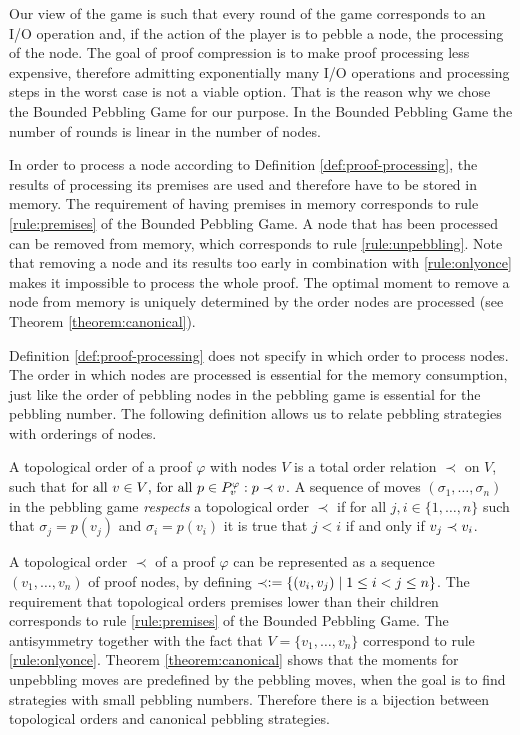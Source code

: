 Our view of the game is such that every round of the game corresponds to an I/O operation and, if the action of the player is to pebble a node, the processing of the node.
The goal of proof compression is to make proof processing less expensive, therefore admitting exponentially many I/O operations and processing steps in the worst case is not a viable option.
That is the reason why we chose the Bounded Pebbling Game for our purpose.
In the Bounded Pebbling Game the number of rounds is linear in the number of nodes.

In order to process a node according to Definition \ref{def:proof-processing}, the results of processing its premises are used and therefore have to be stored in memory.
The requirement of having premises in memory corresponds to rule \ref{rule:premises} of the Bounded Pebbling Game. 
A node that has been processed can be removed from memory, which corresponds to rule \ref{rule:unpebbling}.
Note that removing a node and its results too early in combination with \ref{rule:onlyonce} makes it impossible to process the whole proof.
The optimal moment to remove a node from memory is uniquely determined by the order nodes are processed (see Theorem \ref{theorem:canonical}).

Definition \ref{def:proof-processing} does not specify in which order to process nodes.
The order in which nodes are processed is essential for the memory consumption, just like the order of pebbling nodes in the pebbling game is essential for the pebbling number.
The following definition allows us to relate pebbling strategies with orderings of nodes.

\begin{definition}
\label{def:topological-order}
A topological order of a proof $\varphi$ with nodes $V$ is a total order relation $\prec$ on $V$, such that 
$\text{for all } v \in V \text{, for all } p \in P_{v}^{\varphi}:
p \prec v$.
A sequence of moves $(\sigma_1,\ldots,\sigma_n)$ in the pebbling game \emph{respects} a topological order $\prec$ if for all $j,i \in \{1,\ldots,n\}$ such that $\sigma_j = p(v_j)$ and $\sigma_i = p(v_i)$ it is true that $j < i$ if and only if $v_j \prec v_i$.
\end{definition}

A topological order $\prec$ of a proof $\varphi$ can be represented as a sequence $(v_1,\dots,v_n)$ of proof nodes, by defining $\prec \mathrel{\mathop:}= \{(v_i,v_j) \mid 1 \leq i < j \leq n\}$. 
The requirement that topological orders premises lower than their children corresponds to rule \ref{rule:premises} of the Bounded Pebbling Game.
The antisymmetry together with the fact that $V = \{v_1,\dots,v_n\}$ correspond to rule \ref{rule:onlyonce}.
Theorem \ref{theorem:canonical} shows that the moments for unpebbling moves are predefined by the pebbling moves, when the goal is to find strategies with small pebbling numbers.
Therefore there is a bijection between topological orders and canonical pebbling strategies.

